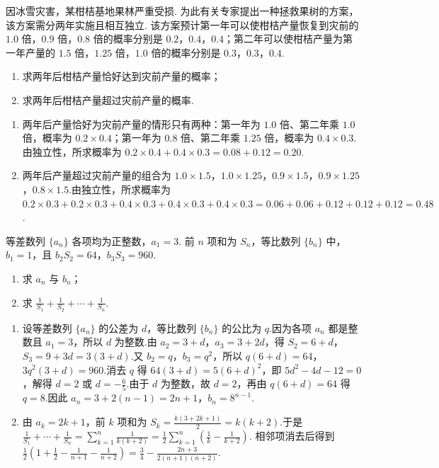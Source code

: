 \begin{problem}
因冰雪灾害，某柑桔基地果林严重受损. 为此有关专家提出一种拯救果树的方案，该方案需分两年实施且相互独立. 该方案预计第一年可以使柑桔产量恢复到灾前的 \(1.0\) 倍，\(0.9\) 倍，\(0.8\) 倍的概率分别是 \(0.2\)，\(0.4\)，\(0.4\)；第二年可以使柑桔产量为第一年产量的 \(1.5\) 倍，\(1.25\) 倍，\(1.0\) 倍的概率分别是 \(0.3\)，\(0.3\)，\(0.4\).
\begin{enumerate}
\item 求两年后柑桔产量恰好达到灾前产量的概率；
\item 求两年后柑桔产量超过灾前产量的概率.
\end{enumerate}
\end{problem}

\begin{solution}
\begin{enumerate}
\item 两年后产量恰好为灾前产量的情形只有两种：第一年为 \(1.0\) 倍、第二年乘 \(1.0\) 倍，概率为 \(0.2\times0.4\)；第一年为 \(0.8\) 倍、第二年乘 \(1.25\) 倍，概率为 \(0.4\times0.3\).由独立性，所求概率为 \(0.2\times0.4+0.4\times0.3=0.08+0.12=0.20\).
\item 两年后产量超过灾前产量的组合为 \(1.0\times1.5\)，\(1.0\times1.25\)，\(0.9\times1.5\)，\(0.9\times1.25\)，\(0.8\times1.5\).由独立性，所求概率为 \(0.2\times0.3+0.2\times0.3+0.4\times0.3+0.4\times0.3+0.4\times0.3=0.06+0.06+0.12+0.12+0.12=0.48\).
\end{enumerate}
\end{solution}

\begin{problem}
等差数列 \(\{a_{n}\}\) 各项均为正整数，\(a_{1} = 3\). 前 \(n\) 项和为 \(S_{n}\)，等比数列 \(\{b_{n}\}\) 中，\(b_{1} = 1\)，且 \(b_{2}S_{2} = 64\)，\(b_{3}S_{3} = 960\).
\begin{enumerate}
\item 求 \( a_{n} \) 与 \( b_{n} \)；
\item 求 \(\frac{1}{S_1} + \frac{1}{S_2} + \cdots + \frac{1}{S_n}\).
\end{enumerate}
\end{problem}

\begin{solution}
\begin{enumerate}
\item 设等差数列 \(\{a_n\}\) 的公差为 \(d\)，等比数列 \(\{b_n\}\) 的公比为 \(q\).因为各项 \(a_n\) 都是整数且 \(a_1=3\)，所以 \(d\) 为整数.由 \(a_2=3+d\)，\(a_3=3+2d\)，得 \(S_2=6+d\)，\(S_3=9+3d=3(3+d)\).又 \(b_2=q\)，\(b_3=q^2\)，所以
\(q(6+d)=64\)，\(3q^2(3+d)=960\).消去 \(q\) 得 \(64(3+d)=5(6+d)^2\)，即 \(5d^2-4d-12=0\)，解得 \(d=2\) 或 \(d=-\frac65\).由于 \(d\) 为整数，故 \(d=2\)，再由 \(q(6+d)=64\) 得 \(q=8\).因此 \(a_n=3+2(n-1)=2n+1\)，\(b_n=8^{n-1}\).
\item 由 \(a_k=2k+1\)，前 \(k\) 项和为 \(S_k=\frac{k(3+2k+1)}2=k(k+2)\).于是
\(\displaystyle\frac1{S_1}+\cdots+\frac1{S_n}=\sum_{k=1}^n\frac1{k(k+2)}=\frac12\sum_{k=1}^n\left(\frac1k-\frac1{k+2}\right)\).
相邻项消去后得到 \(\displaystyle\frac12\left(1+\frac12-\frac1{n+1}-\frac1{n+2}\right)=\frac34-\frac{2n+3}{2(n+1)(n+2)}\).
\end{enumerate}
\end{solution}

